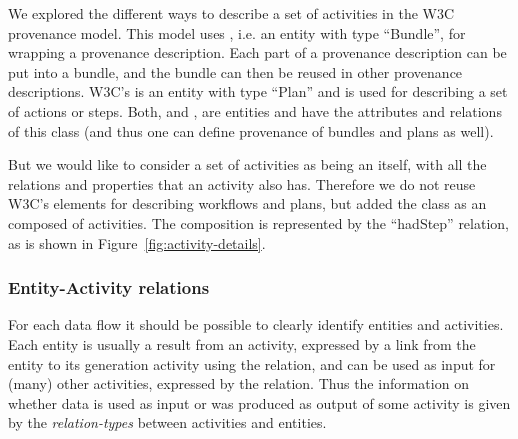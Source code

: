 

We explored the different ways to describe a set of activities in the W3C 
provenance model. This model uses , i.e. an entity with type ``Bundle'', 
for wrapping a provenance description. Each part of a provenance description can be 
put into a bundle, and the bundle can then be reused in other provenance descriptions. 
W3C's  is an entity with type ``Plan'' and is used for describing a 
set of actions or steps. Both,  and , are entities and 
have the attributes and relations of this class (and thus one can define provenance of bundles and plans as well).

But we would like to consider a set of activities as being an  itself, 
with all the relations and properties that an activity also has. Therefore we do not reuse
W3C's elements for describing workflows and plans, but added 
the class  as an composed of activities. The composition is represented by 
the ``hadStep'' relation, as is shown in Figure~\ref{fig:activity-details}.

%



\subsubsection{Entity-Activity relations}\label{sec:entity-activity-relations}

For each data flow it should be possible to clearly identify entities and 
activities. 
Each entity is usually a result from an activity, expressed by a link from 
the entity to its generation activity using the  relation,
and can be used as input for (many) other activities, expressed by the  relation.
Thus the information on whether data is used as input or was produced as output of 
some activity is given by the \emph{relation-types} between activities and entities.

